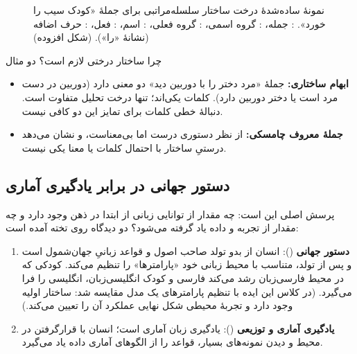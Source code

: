 \begin{figure}[htbp]
\centering
{}
\caption{نمونهٔ ساده‌شدهٔ درخت ساختار سلسله‌مراتبی برای جملهٔ «کودک سیب را خورد». : جمله، : گروه اسمی، : گروه فعلی، : اسم، : فعل، : حرف اضافه (نشانهٔ «را»). (شکل افزوده)}
\label{fig:ch02-tree}
\end{figure}

\begin{addedbox}{چرا ساختار درختی لازم است؟ دو مثال}
\begin{itemize}
  \item \textbf{ابهام ساختاری:} جملهٔ «مرد دختر را با دوربین دید» دو معنی دارد (دوربین در دست مرد است یا دختر دوربین دارد). کلمات یکی‌اند؛ تنها درخت تحلیل متفاوت است. دنبالهٔ خطی کلمات برای تمایز این دو کافی نیست.
  \item \textbf{جملهٔ معروف چامسکی:}  از نظر دستوری درست اما بی‌معناست، و نشان می‌دهد درستیِ ساختار با احتمال کلمات یا معنا یکی نیست.
\end{itemize}
\end{addedbox}

\subsection{دستور جهانی در برابر یادگیری آماری}
پرسش اصلی این است: چه مقدار از توانایی زبانی از ابتدا در ذهن وجود دارد و چه مقدار از تجربه و داده یاد گرفته می‌شود؟ دو دیدگاه روی تخته آمده است:
\begin{enumerate}
  \item \textbf{دستور جهانی} (): انسان از بدو تولد صاحب اصول و قواعد زبانیِ جهان‌شمول است و پس از تولد، متناسب با محیط زبانی خود «پارامترها» را تنظیم می‌کند. کودکی که در محیط فارسی‌زبان رشد می‌کند فارسی و کودک انگلیسی‌زبان، انگلیسی را فرا می‌گیرد. (در کلاس این ایده با تنظیم پارامترهای یک مدل مقایسه شد: ساختار اولیه وجود دارد و تجربهٔ محیطی شکل نهایی عملکرد آن را تعیین می‌کند.)
  \item \textbf{یادگیری آماری و توزیعی} (): یادگیری زبان آماری است؛ انسان با قرارگرفتن در محیط و دیدن نمونه‌های بسیار، قواعد را از الگوهای آماری داده یاد می‌گیرد.
\end{enumerate}

